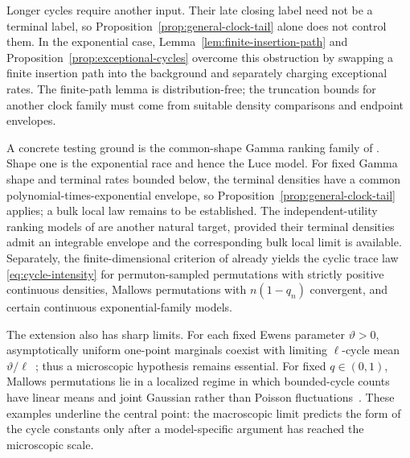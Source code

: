 \documentclass[11pt]{article}
\theoremstyle{remark}
\theoremstyle{plain}
\begin{document}
Longer cycles require another input.  Their late closing label need not be a
terminal label, so Proposition~\ref{prop:general-clock-tail} alone does not
control them.  In the exponential case, Lemma~\ref{lem:finite-insertion-path}
and Proposition~\ref{prop:exceptional-cycles} overcome this obstruction by
swapping a finite insertion path into the background and separately charging
exceptional rates.  The finite-path lemma is distribution-free; the
truncation bounds for another clock family must come from suitable density
comparisons and endpoint envelopes.

A concrete testing ground is the common-shape Gamma ranking family of
\cite{stern1990models}.  Shape one is the exponential race and hence the Luce
model.  For fixed Gamma shape and terminal rates bounded below, the terminal
densities have a common polynomial-times-exponential envelope, so
Proposition~\ref{prop:general-clock-tail} applies; a bulk local law remains to
be established.  The independent-utility ranking models of
\cite{thurstone1927law} are another natural target, provided their terminal
densities admit an integrable envelope and the corresponding bulk local limit
is available.  Separately, the finite-dimensional criterion of
\cite{mukherjee2016fixed} already yields the cyclic trace law
\eqref{eq:cycle-intensity} for permuton-sampled permutations with strictly
positive continuous densities, Mallows permutations with $n(1-q_n)$
convergent, and certain continuous exponential-family models.

The extension also has sharp limits.  For each fixed Ewens
parameter $\vartheta>0$, asymptotically uniform one-point marginals coexist
with limiting $\ell$-cycle mean $\vartheta/\ell$~\cite{tavare2021magical};
thus a microscopic hypothesis remains essential.  For fixed $q\in(0,1)$,
Mallows permutations lie in a localized regime in which bounded-cycle counts
have linear means and joint Gaussian rather than Poisson
fluctuations~\cite{he2023cycles}.  These examples underline the central
point: the macroscopic limit predicts the form of the cycle constants only
after a model-specific argument has reached the microscopic scale.


\small

\end{document}
